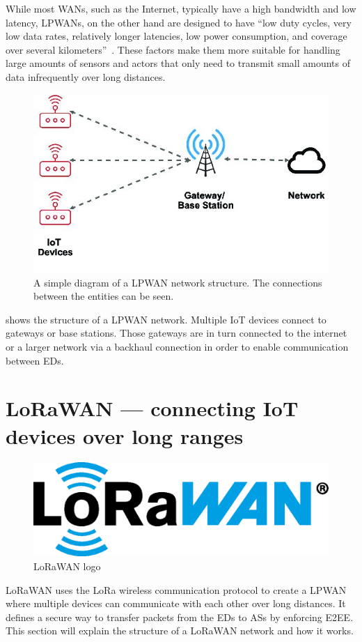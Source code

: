 While most \acp{WAN}, such as the Internet, typically have a high bandwidth and low latency, \acp{LPWAN}, on the other hand are designed to have ``low duty cycles, very low data rates, relatively longer latencies, low power consumption, and coverage over several kilometers''~\cite[p. 289]{kumar_connecting_2023}.
These factors make them more suitable for handling large amounts of sensors and actors that only need to transmit small amounts of data infrequently over long distances.

\begin{figure}[htbp]
    \centering
    \includegraphics[width=.5\textwidth]{pictures/lorawan-structure/lpwan_network_structure.jpg}
    \caption{
        A simple diagram of a \ac{LPWAN} network structure.
        The connections between the entities can be seen.\protect\cite{fernandez_assessing_2020}
    }\label{pic:lpwan-diagram}
\end{figure}

 shows the structure of a \ac{LPWAN} network.
Multiple \ac{IoT} devices connect to gateways or base stations.
Those gateways are in turn connected to the internet or a larger network via a backhaul connection in order to enable communication between \aclp{ED}.

\section{\acl{LoRaWAN} — connecting \acl{IoT} devices over long ranges}\label{sec:lorawan}

\begin{figure}[htbp]
    \centering
    \includegraphics[width=.3\textwidth]{pictures/logos/LoRaWAN_Logo.eps}
    \caption{
        \ac{LoRaWAN} logo~\protect\cite{lora_alliance_francais_2022}
    }
\end{figure}

\ac{LoRaWAN} uses the \ac{LoRa} wireless communication protocol to create a \ac{LPWAN} where multiple devices can communicate with each other over long distances.
It defines a secure way to transfer packets from the \aclp{ED} to \acp{AS} by enforcing \ac{E2EE}.
This section will explain the structure of a \ac{LoRaWAN} network and how it works.

